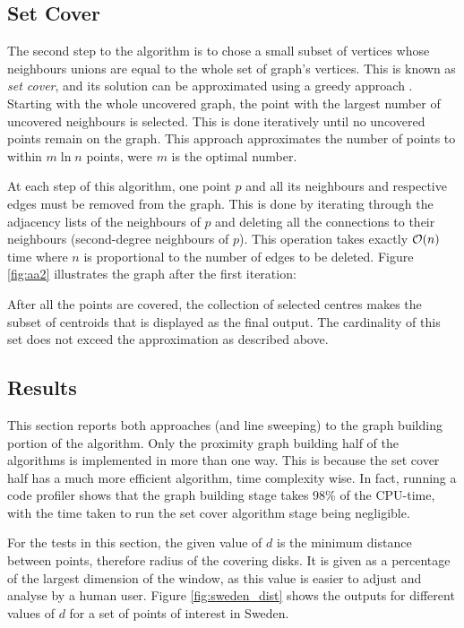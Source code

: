 \subsection{Set Cover}
The second step to the algorithm is to chose a small subset of vertices whose neighbours unions are equal to the whole set of graph's vertices. This is known as \emph{set cover}, and its solution can be approximated using a greedy approach \cite{approxalgos}. Starting with the whole uncovered graph, the point with the largest number of uncovered neighbours is selected. This is done iteratively until no uncovered points remain on the graph. This approach approximates the number of points to within $m \ln{n}$ points, were $m$ is the optimal number.

At each step of this algorithm, one point $p$ and all its neighbours and respective edges must be removed from the graph. This is done by iterating through the adjacency lists of the neighbours of $p$ and deleting all the connections to their neighbours (second-degree neighbours of $p$). This operation takes exactly $\mathcal{O}(n)$ time where $n$ is proportional to the number of edges to be deleted. Figure \ref{fig:aa2} illustrates the graph after the first iteration:



After all the points are covered, the collection of selected centres makes the subset of centroids that is displayed as the final output. The cardinality of this set does not exceed the approximation as described above.


\subsection{Results}
\begin{change}
This section reports both approaches (\kdtrees and line sweeping) to the graph building portion of the algorithm. Only the proximity graph building half of the algorithms is implemented in more than one way. This is because the set cover half has a much more efficient algorithm, time complexity wise. In fact, running a code profiler shows that the graph building stage takes 98\% of the CPU-time, with the time taken to run the set cover algorithm stage being negligible.
\end{change}

For the tests in this section, the given value of $d$ is the minimum distance between points, therefore radius of the covering disks. It is given as a percentage of the largest dimension of the window, as this value is easier to adjust and analyse by a human user.
Figure \ref{fig:sweden_dist} shows the outputs for different values of $d$ for a set of points of interest in Sweden.

